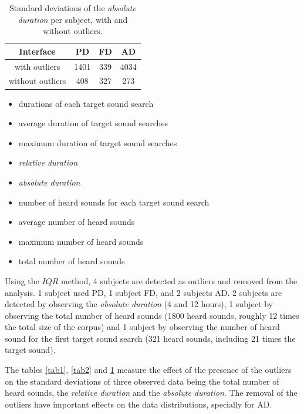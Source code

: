 \documentclass{aes2e}
\begin{document}
\begin{table}[t]
\caption{\label{tab3} Standard deviations of the \textit{absolute duration} per subject, with and without outliers.}
\begin{center}
\begin{tabular}{cccc}
Interface &  PD &  FD &  AD \\
\hline
with outliers & 1401 & 339 & 4034 \\
without outliers & 408 & 327 & 273 \\  
\hline
\end{tabular}
\end{center}
\end{table}


\begin{itemize}
\item durations of  each target sound search
\item average duration of target sound searches
\item maximum duration of target sound searches
\item \textit{relative duration}
\item \textit{absolute duration}
\item number of heard sounds for each target sound search
\item average number of heard sounds
\item maximum number of heard sounds
\item total number of heard sounds
\end{itemize}

Using the $IQR$ method, 4 subjects are detected as outliers and removed from the analysis. 1 subject used PD, 1 subject FD, and 2 subjects AD. 2 subjects are detected by observing the \textit{absolute duration} (4 and 12 hours), 1 subject by observing the total number of heard sounds (1800 heard sounds, roughly 12 times the total size of the corpus) and 1 subject by observing the number of heard sound for the first target sound search (321 heard sounds, including 21 times the target sound).

The tables \ref{tab1}, \ref{tab2} and \ref{tab3} measure the effect of the presence of the  outliers on the standard deviations of three observed data being the total number of heard sounds, the \textit{relative duration} and the \textit{absolute duration}. The removal of the outliers have important effects on the data distributions, specially for AD.
\end{document}
